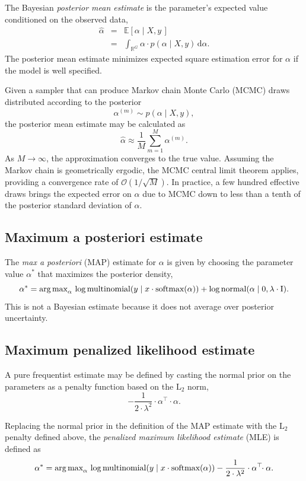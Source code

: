 \documentclass[11pt]{article}
\newcommand{\rob}[1]{\todo[inline]{\textbf{Robert: }#1}}
\begin{document}
The Bayesian \emph{posterior mean estimate} is the parameter's
expected value conditioned on the observed data,
\begin{eqnarray*}
  \widehat{\alpha}
  & = & \mathbb{E}\!\left[\alpha \mid X, y \, \right]
  \\[6pt]
  & = & \int_{\mathbb{R}^G} \alpha \cdot p(\alpha \mid X, y) \, \textrm{d}\alpha.
\end{eqnarray*}
The posterior mean estimate minimizes expected square estimation error
for $\alpha$ if the model is well specified.

Given a sampler that can produce Markov chain Monte Carlo (MCMC) draws
distributed according to the posterior
\[
  \alpha^{(m)} \sim p(\alpha \mid X, y),
\]
the posterior mean estimate may be calculated as
\[
  \widehat{\alpha} \approx \frac{1}{M} \sum_{m = 1}^M \alpha^{(m)}.
\]
As $M \rightarrow \infty$, the approximation converges to the true
value.  Assuming the Markov chain is geometrically ergodic, the MCMC
central limit theorem applies, providing a convergence rate of
$\mathcal{O}\left(1 / \sqrt{M}\right)$.  In practice, a few hundred
effective draws brings the expected error on $\widehat{\alpha}$ due to
MCMC down to less than a tenth of the posterior standard deviation of
$\alpha$.

\subsection{Maximum a posteriori estimate}
\rob{Why are we mentioning this?}
The \emph{max a posteriori} (MAP) estimate for $\alpha$ is given by
choosing the parameter value $\alpha^*$ that maximizes the posterior
density,
\[
  \alpha^* = \textrm{arg\,max}_{\alpha} \,
  \log \textrm{multinomial}(y \mid x \cdot \textrm{softmax}(\alpha))
  + \log \textrm{normal}(\alpha \mid 0, \lambda \cdot \textrm{I}).
\]
This is not a Bayesian estimate because it does not average over
posterior uncertainty.


\subsection{Maximum penalized likelihood estimate}

A pure frequentist estimate may be defined by casting the normal prior
on the parameters as a penalty function based on the $\textrm{L}_2$
norm,
\[
  -\frac{1}{2 \cdot \lambda^2} \cdot \alpha^{\top}\!\! \cdot \alpha.
\]

Replacing the normal prior in the definition of the MAP estimate with
the $\textrm{L}_2$ penalty defined above, the
\emph{penalized maximum likelihood estimate} (MLE) is defined as
\[
  \alpha^* = \textrm{arg\,max}_{\alpha} \,
  \log \textrm{multinomial}(y \mid x \cdot \textrm{softmax}(\alpha))
  - \frac{1}{2 \cdot \lambda^2} \cdot \alpha^{\top}\!\! \cdot \alpha.
\]
\end{document}
